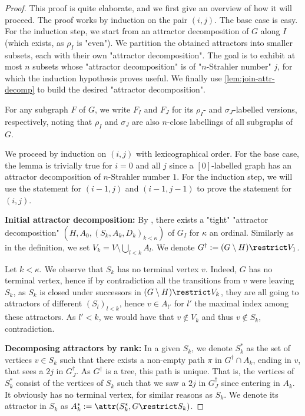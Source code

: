 \documentclass[a4paper,UKenglish,cleveref, autoref, thm-restate]{lipics-v2021}
\begin{document}
\begin{proof}
	
	This proof is quite elaborate, and we first give an overview of how it will proceed. The proof works by induction on the pair $(i,j)$. The base case is easy. For the induction step, we start from an attractor decomposition of $G$ along $I$ (which exists, as $\rho_I$ is "even"). We partition the obtained attractors into smaller subsets, each with their own "attractor decomposition". The goal is to exhibit at most $n$ subsets whose "attractor decomposition" is of "$n$-Strahler number" $j$, for which the induction hypothesis proves useful. We finally use \cref{lem:join-attr-decomp} to build the desired "attractor decomposition".
	
	For any subgraph $F$ of $G$, we write $F_I$ and $F_J$ for its $\rho_I$- and $\sigma_J$-labelled versions, respectively, noting that $\rho_I$ and $\sigma_J$ are also $n$-close labellings of all subgraphs of $G$.
	
	We proceed by induction on $(i,j)$ with lexicographical order. For the base case, the lemma is trivially true for $i=0$ and all $j$ since a $[0]$-labelled graph has an attractor decomposition of $n$-Strahler number $1$.
	For the induction step, we will use the statement for $(i-1,j)$ and $(i-1,j-1)$ to prove the statement for $(i,j)$.
	
	\textbf{{Initial attractor decomposition:}} By , there exists a "tight" "attractor decomposition" $(H,A_0, (S_k,A_k,D_k)_{k<\kappa})$ of $G_I$ for $\kappa$ an ordinal. Similarly as in the definition, we set $V_k=V\setminus \bigcup_{l< k}A_l$. We denote $G^\dagger := (G\setminus H)\restrict V_1$.
	
	Let $k<\kappa$. We observe that $S_k$ has no terminal vertex $v$. Indeed, $G$ has no terminal vertex, hence if by contradiction all the transitions from $v$ were leaving $S_k$, as $S_k$ is closed under successors in $(G\setminus H) \restrict V_k$, they are all going to attractors of different $(S_{l})_{l <k}$, hence $v \in A_{l'}$ for $l'$ the maximal index among these attractors. As $l' < k$, we would have that $v \notin V_k$ and thus $v\notin S_k$, contradiction.
	
	\textbf{{Decomposing attractors by rank:}} In a given $S_k$, we denote $S^*_k$ as the set of vertices $v\in S_k$ such that there exists a non-empty path $\pi$ in $G^\dagger \cap A_k$, ending in $v$, that sees a $2j$ in $G^\dagger_J$. As $G^\dagger$ is a tree, this path is unique. That is, the vertices of $S^*_k$ consist of the vertices of $S_k$ such that we saw a $2j$ in $G^\dagger_J$ since entering in $A_k$. It obviously has no terminal vertex, for similar reasons as $S_k$. We denote its attractor in $S_k$ as $A^*_k := \attr(S^*_k, G\restrict S_k )$.
	

\end{proof}
\end{document}
